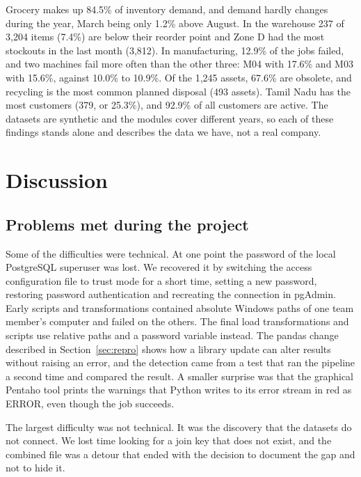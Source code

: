 \documentclass[12pt,a4paper]{report}
\begin{document}
Grocery makes up 84.5\% of inventory demand, and demand hardly changes during the year, March being only 1.2\% above August. In the warehouse 237 of 3,204 items (7.4\%) are below their reorder point and Zone D had the most stockouts in the last month (3,812). In manufacturing, 12.9\% of the jobs failed, and two machines fail more often than the other three: M04 with 17.6\% and M03 with 15.6\%, against 10.0\% to 10.9\%. Of the 1,245 assets, 67.6\% are obsolete, and recycling is the most common planned disposal (493 assets). Tamil Nadu has the most customers (379, or 25.3\%), and 92.9\% of all customers are active. The datasets are synthetic and the modules cover different years, so each of these findings stands alone and describes the data we have, not a real company.

\chapter{Discussion}\label{ch:disc}

\section{Problems met during the project}
Some of the difficulties were technical. At one point the password of the local PostgreSQL superuser was lost. We recovered it by switching the access configuration file to trust mode for a short time, setting a new password, restoring password authentication and recreating the connection in pgAdmin. Early scripts and transformations contained absolute Windows paths of one team member's computer and failed on the others. The final load transformations and scripts use relative paths and a password variable instead. The pandas change described in Section~\ref{sec:repro} shows how a library update can alter results without raising an error, and the detection came from a test that ran the pipeline a second time and compared the result. A smaller surprise was that the graphical Pentaho tool prints the warnings that Python writes to its error stream in red as \textsf{ERROR}, even though the job succeeds.

The largest difficulty was not technical. It was the discovery that the datasets do not connect. We lost time looking for a join key that does not exist, and the combined file was a detour that ended with the decision to document the gap and not to hide it.
\end{document}
